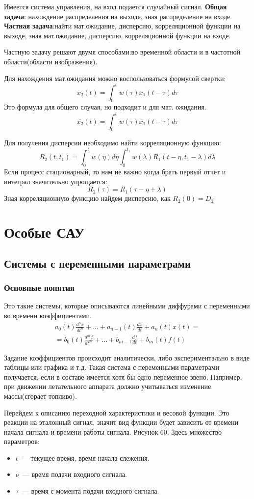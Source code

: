 Имеется система управления, на вход подается случайный сигнал. \textbf{Общая задача}: нахождение распределения на выходе, зная распределение на входе. \textbf{Частная задача}:найти мат.ожидание, дисперсию, корреляционной функции на выходе, зная мат.ожидание, дисперсию, корреляционной функции на входе. 

Частную задачу решают двумя способами:во временной области и в частотной области(области изображения).

Для нахождения мат.ожидания можно воспользоваться формулой свертки:
$$
	x_2(t)=\int^t_0w(\tau)x_1(t-\tau)d\tau
$$
Это формула для общего случая, но подходит и для мат. ожидания.
$$
	\overline{x_2}(t)=\int^t_0w(\tau)\overline{x_1}(t-\tau)d\tau
$$

Для получения дисперсии необходимо найти корреляционную функцию:
$$
	R_2(t,t_1)=\int^t_0w(\eta)d\eta\int^{t_1}_0w(\lambda)R_1(t-\eta,t_1-\lambda)d\lambda
$$
Если процесс стационарный, то нам не важно когда брать первый отчет и интеграл значительно упрощается:
$$
	R_2(\tau)=R_1(\tau-\eta+\lambda)
$$
Зная корреляционную функцию найдем дисперсию, как $R_2(0)=D_2$

\section{Особые САУ}
\subsection{Системы с переменными параметрами}
\subsubsection{Основные понятия}
Это такие системы, которые описываются линейными диффурами с переменными во времени коэффициентами. 
\begin{align*}
	a_0(t)\frac{d^nx}{dt^n}+\ldots+a_{n-1}(t)\frac{dx}{dt}+a_n(t)x(t)= \\
	=b_0(t)\frac{d^mf}{dt^m}+\ldots+b_{m-1}\frac{df}{dt}+b_m(t)f(t)
\end{align*}

Задание коэффициентов происходит аналитически, либо экспериментально в виде таблицы или графика и т.д. Такая система с переменными параметрами получается, если в составе имеется хотя бы одно переменное звено. Например, при движении летательного аппарата должно учитываться изменение массы(сгорает топливо).

Перейдем к описанию переходной характеристики и весовой функции. Это реакции на эталонный сигнал, значит вид функции будет зависить от времени начала сигнала и времени работы сигнала. Рисунок 60. Здесь множество параметров:
\begin{itemize}
	\item $t$~--- текущее время, время начала слежения.
	\item $\nu$~--- время подачи входного сигнала.
	\item $\tau$~--- время с момента подачи входного сигнала.
\end{itemize}

